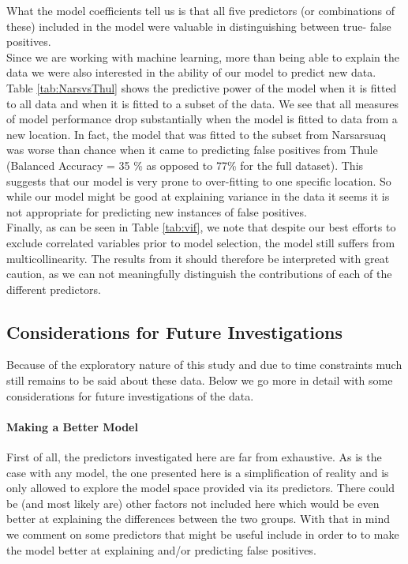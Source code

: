 \documentclass[12pt]{article}
\begin{document}
What the model coefficients tell us is that all five predictors (or combinations of these) included in the model were valuable in distinguishing between true- false positives.\\

Since we are working with machine learning, more than being able to explain the data we were also interested in the ability of our model to predict new data. Table \ref{tab:NarsvsThul} shows the predictive power of the model when it is fitted to all data and when it is fitted to a subset of the data. We see that all measures of model performance drop substantially when the model is fitted to data from a new location. In fact, the model that was fitted to the subset from Narsarsuaq was worse than chance when it came to predicting false positives from Thule (Balanced Accuracy = 35 \% as opposed to 77\% for the full dataset). This suggests that our model is very prone to over-fitting to one specific location. So while our model might be good at explaining variance in the data it seems it is not appropriate for predicting new instances of false positives.\\

Finally, as can be seen in Table \ref{tab:vif}, we note that despite our best efforts to exclude correlated variables prior to model selection, the model still suffers from multicollinearity. The results from it should therefore be interpreted with great caution, as we can not meaningfully distinguish the contributions of each of the different predictors.

\subsection{Considerations for Future Investigations}
Because of the exploratory nature of this study and due to time constraints much still remains to be said about these data. Below we go more in detail with some considerations for future investigations of the data.

\paragraph{Making a Better Model}
First of all, the predictors investigated here are far from exhaustive. As is the case with any model, the one presented here is a simplification of reality and is only allowed to explore the model space provided via its predictors. There could be (and most likely are) other factors not included here which would be even better at explaining the differences between the two groups. With that in mind we comment on some predictors that might be useful include in order to to make the model better at explaining and/or predicting false positives.\\
\end{document}
